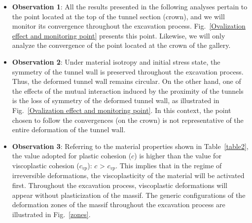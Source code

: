 \documentclass[a4paper,fleqn]{cas-sc}
\begin{document}
\begin{itemize}[]
	
	\item \textbf{Observation 1}: All the results presented in the following analyses pertain to the point located at the top of the tunnel section (crown), and we will monitor its convergence throughout the excavation process. Fig.~\ref{Ovalization effect and monitoring point} presents this point. Likewise, we will only analyze the convergence of the point located at the crown of the gallery. 

	\item \textbf{Observation 2}: Under material isotropy and initial stress state, the symmetry of the tunnel wall is preserved throughout the excavation process. Thus, the deformed tunnel wall remains circular. On the other hand, one of the effects of the mutual interaction induced by the proximity of the tunnels is the loss of symmetry of the deformed tunnel wall, as illustrated in Fig.~\ref{Ovalization effect and monitoring point}. In this context, the point chosen to follow the convergences (on the crown) is not representative of the entire deformation of the tunnel wall. 
	
	\item \textbf{Observation 3}: Referring to the material properties shown in Table~\ref{table2}, the value adopted for plastic cohesion ($c$) is higher than the value for viscoplastic cohesion ($c_{vp}$): $c$ > $c_{vp}$. This implies that in the regime of irreversible deformations, the viscoplasticity of the material will be activated first. Throughout the excavation process, viscoplastic deformations will appear without plasticization of the massif. The generic configurations of the deformation zones of the massif throughout the excavation process are illustrated in Fig.~\ref{zones}.
	
\end{itemize}
\end{document}
